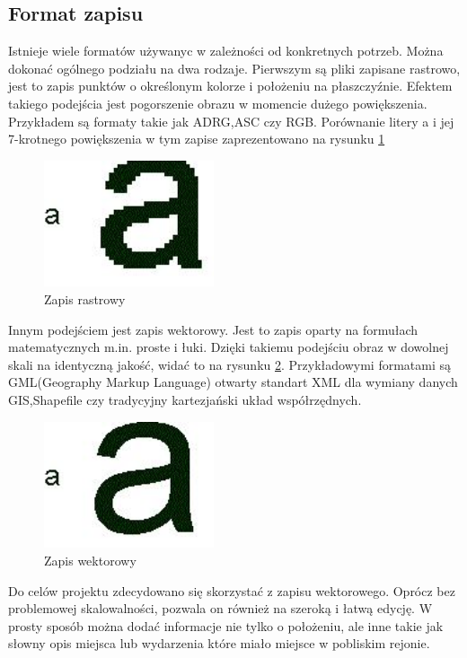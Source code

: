 \subsection{Format zapisu}
\label{subsec:zapis}

Istnieje wiele formatów używanyc w zależności od konkretnych potrzeb. Można dokonać ogólnego podziału na dwa rodzaje. Pierwszym są pliki zapisane rastrowo, jest to zapis punktów o określonym kolorze i położeniu na płaszczyźnie. Efektem takiego podejścia jest pogorszenie obrazu w momencie dużego powiększenia. Przykładem są formaty takie jak ADRG,ASC czy RGB.
Porównanie litery a i jej 7-krotnego powiększenia w tym zapise zaprezentowano na rysunku \ref{fig:rast}
  \begin{figure}[H]
  \centering
    \includegraphics[width=50mm]{ge/a2.jpg}
  \caption{Zapis rastrowy}
  \label{fig:rast}
  \end{figure}

Innym podejściem jest zapis wektorowy. Jest to zapis oparty na formułach matematycznych m.in. proste i łuki. Dzięki takiemu podejściu obraz w dowolnej skali na identyczną jakość, widać to na rysunku \ref{fig:wekt}. Przykładowymi formatami są GML(Geography Markup Language) otwarty standart XML dla wymiany danych GIS,Shapefile czy tradycyjny kartezjański układ współrzędnych.

  \begin{figure}[H]
  \centering
    \includegraphics[width=50mm]{ge/a1.jpg}
  \caption{Zapis wektorowy}
  \label{fig:wekt}
  \end{figure}

Do celów projektu zdecydowano się skorzystać z zapisu wektorowego. Oprócz bez problemowej skalowalności, pozwala on również na szeroką i łatwą edycję. W prosty sposób można dodać informacje nie tylko o położeniu, ale inne takie jak słowny opis miejsca lub wydarzenia które miało miejsce w pobliskim rejonie.

